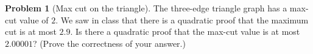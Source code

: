 \documentclass[11pt]{article}
\theoremstyle{definition}
\newtheorem{problem}[theorem]{Problem}
\begin{document}
\begin{problem}[Max cut on the triangle]
  The three-edge triangle graph has a max-cut value of $2$.
  We saw in class that there is a quadratic proof that the maximum cut is at most $2.9$.
  Is there a quadratic proof that the max-cut value is at most $2.00001$?
  (Prove the correctness of your answer.)
\end{problem}
\end{document}
